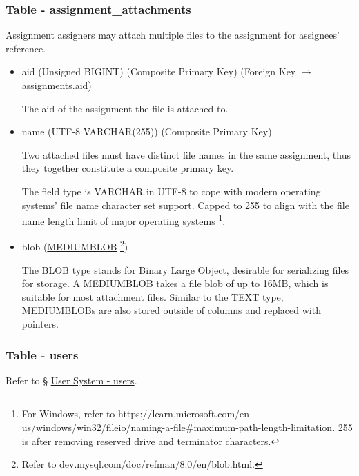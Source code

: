 \documentclass[12pt]{report}
\newcommand{\n}{\par}
\begin{document}
\subsubsection{Table - assignment\_attachments} \label{data-layer.design.assignment-system.assignment_attachments}
Assignment assigners may attach multiple files to the assignment for assignees' reference.
\begin{itemize}
	\item aid (Unsigned BIGINT) (Composite Primary Key) (Foreign Key $\rightarrow$ assignments.aid)\n
	      The aid of the assignment the file is attached to.
	\item name (UTF-8 VARCHAR(255)) (Composite Primary Key)\n
	      Two attached files must have distinct file names in the same assignment,
	      thus they together constitute a composite primary key.\n
	      The field type is VARCHAR in UTF-8 to cope with modern operating systems' file name character set support.
	      Capped to 255 to align with the file name length limit of major operating systems
	      \footnote{For Windows, refer to https://learn.microsoft.com/en-us/windows/win32/fileio/naming-a-file\#maximum-path-length-limitation.
		      255 is after removing reserved drive and terminator characters.}.
	\item blob (\href{https://dev.mysql.com/doc/refman/8.0/en/blob.html}{MEDIUMBLOB}
	      \footnote{Refer to dev.mysql.com/doc/refman/8.0/en/blob.html.})\n
	      The BLOB type stands for Binary Large Object, desirable for serializing files for storage.
	      A MEDIUMBLOB takes a file blob of up to 16MB, which is suitable for most attachment files.
	      Similar to the TEXT type, MEDIUMBLOBs are also stored outside of columns and replaced with pointers.
\end{itemize}

\subsubsection{Table - users} \label{data-layer.design.assignment-system.users}
Refer to \S{} \hyperref[data-layer.design.user-system.users]{User System - users}.
\end{document}
